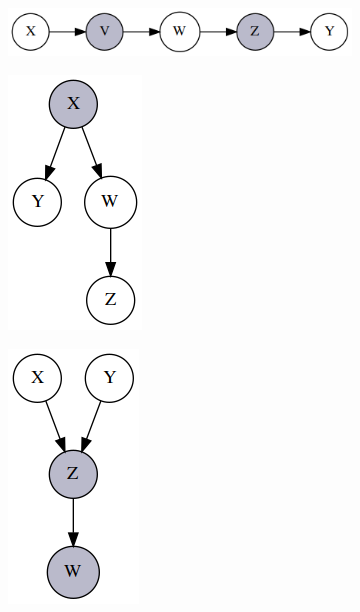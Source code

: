\begin{figure}[h!]
	\centering		
	\begin{subfigure}{\linewidth}
		\centering
		\includegraphics[width=0.6\linewidth]{./images/Chapter 2/chain-indep.png}
		\label{fig:chain-indep}
	\end{subfigure}
	\begin{subfigure}{0.40\linewidth}
		\centering
		\includegraphics[width=0.5\linewidth]{./images/Chapter 2/fork-indep.png}		
		\label{fig:fork-indep}
	\end{subfigure}
	\begin{subfigure}{0.40\linewidth}
		\centering
		\includegraphics[width=0.5\linewidth]{./images/Chapter 2/collider-indep.png}

\end{subfigure}
\end{figure}
